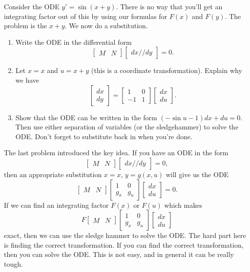 \begin{problem}
 Consider the ODE $y'=\sin(x+y)$. There is no way that you'll get an integrating factor out of this by using our formulas for $F(x)$ and $F(y)$.  The problem is the $x+y$.  We now do a substitution.
\begin{enumerate}
 \item Write the ODE in the differential form $$\begin{bmatrix}M&N\end{bmatrix}\begin{bmatrix}dx//dy\end{bmatrix}=0.$$
 \item Let $x=x$ and $u=x+y$ (this is a coordinate transformation). Explain why we have
$$\begin{bmatrix}dx\\dy\end{bmatrix}=\begin{bmatrix}1&0\\-1&1\end{bmatrix}\begin{bmatrix}dx\\du\end{bmatrix}.$$
 \item Show that the ODE can be written in the form $(-\sin u - 1)dx+du=0$.  Then use either separation of variables (or the sledgehammer) to solve the ODE.  Don't forget to substitute back in when you're done.
\end{enumerate}
\end{problem}
  
The last problem introduced the key idea.  If you have an ODE in the form 
$$\begin{bmatrix}M&N\end{bmatrix}\begin{bmatrix}dx//dy\end{bmatrix}=0,$$
then an appropriate substitution $x=x$, $y=g(x,u)$ will give us the ODE
$$\begin{bmatrix}M&N\end{bmatrix}\begin{bmatrix}1&0\\g_x&g_u\end{bmatrix}\begin{bmatrix}dx\\du\end{bmatrix}=0.$$
If we can find an integrating factor $F(x)$ or $F(u)$ which makes 
$$F\begin{bmatrix}M&N\end{bmatrix}\begin{bmatrix}1&0\\g_x&g_u\end{bmatrix}\begin{bmatrix}dx\\du\end{bmatrix}$$
exact, then we can use the sledge hammer to solve the ODE.  The hard part here is finding the correct transformation.  If you can find the correct transformation, then you can solve the ODE.  This is not easy, and in general it can be really tough. 



